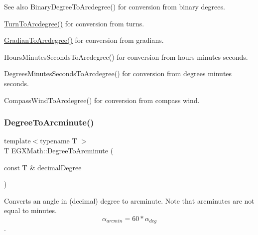 \begin{DoxySeeAlso}{See also}
Binary\+Degree\+To\+Arcdegree() for conversion from binary degrees. 

\mbox{\hyperlink{group___e_g_x_math-_angle_conversions-_turn_ga7bdc3a81ce316dd47b1a3179489fa195}{Turn\+To\+Arcdegree()}} for conversion from turns. 

\mbox{\hyperlink{group___e_g_x_math-_angle_conversions-_gradian_gacd0b1797f2460944dcbc541a855ec21c}{Gradian\+To\+Arcdegree()}} for conversion from gradians. 

Hours\+Minutes\+Seconds\+To\+Arcdegree() for conversion from hours minutes seconds. 

Degrees\+Minutes\+Seconds\+To\+Arcdegree() for conversion from degrees minutes seconds. 

Compass\+Wind\+To\+Arcdegree() for conversion from compass wind. 
\end{DoxySeeAlso}
\mbox{\label{group___e_g_x_math-_angle_conversions-_degree_ga8abf327dc5f52907b2c881999e9cc43e}} 
\subsubsection{\texorpdfstring{Degree\+To\+Arcminute()}{DegreeToArcminute()}}
{\footnotesize\ttfamily template$<$typename T $>$ \\
T E\+G\+X\+Math\+::\+Degree\+To\+Arcminute (\begin{DoxyParamCaption}\item[{const T \&}]{decimal\+Degree }\end{DoxyParamCaption})}



Converts an angle in (decimal) degree to arcminute. Note that arcminutes are not equal to minutes. \[\alpha_{arcmin}= 60 * \alpha_{deg}\]. 

